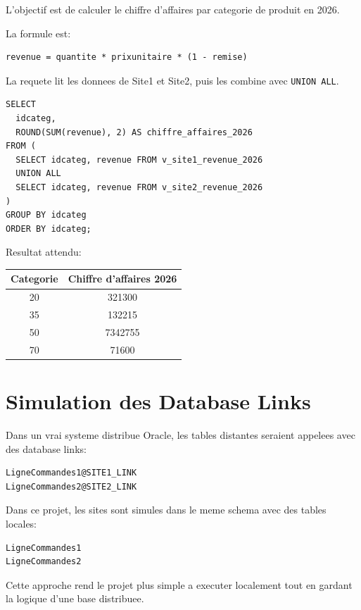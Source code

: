 \documentclass[12pt,a4paper]{report}
\begin{document}
L'objectif est de calculer le chiffre d'affaires par categorie de produit en 2026.

La formule est:

\begin{lstlisting}[style=textstyle]
revenue = quantite * prixunitaire * (1 - remise)
\end{lstlisting}

La requete lit les donnees de Site1 et Site2, puis les combine avec \texttt{UNION ALL}.

\begin{lstlisting}[style=sqlstyle]
SELECT
  idcateg,
  ROUND(SUM(revenue), 2) AS chiffre_affaires_2026
FROM (
  SELECT idcateg, revenue FROM v_site1_revenue_2026
  UNION ALL
  SELECT idcateg, revenue FROM v_site2_revenue_2026
)
GROUP BY idcateg
ORDER BY idcateg;
\end{lstlisting}

Resultat attendu:

\begin{center}
\begin{tabular}{|c|c|}
\hline
Categorie & Chiffre d'affaires 2026 \\
\hline
20 & 321300 \\
\hline
35 & 132215 \\
\hline
50 & 7342755 \\
\hline
70 & 71600 \\
\hline
\end{tabular}
\end{center}

\chapter{Simulation des Database Links}

Dans un vrai systeme distribue Oracle, les tables distantes seraient appelees avec des database links:

\begin{lstlisting}[style=sqlstyle]
LigneCommandes1@SITE1_LINK
LigneCommandes2@SITE2_LINK
\end{lstlisting}

Dans ce projet, les sites sont simules dans le meme schema avec des tables locales:

\begin{lstlisting}[style=textstyle]
LigneCommandes1
LigneCommandes2
\end{lstlisting}

Cette approche rend le projet plus simple a executer localement tout en gardant la logique d'une base distribuee.
\end{document}
